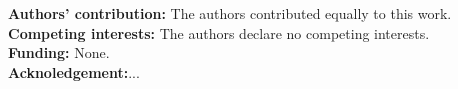 \documentclass[a4paper, 12pt]{article}
\begin{document}

\newpage
{}








\noindent\small \textbf{Authors' contribution:} The authors contributed equally to this work. \\ 
\noindent\small \textbf{Competing interests:} The authors declare no competing interests.\\
\noindent\small \textbf{Funding:} None.\\
\noindent\small \textbf{Acknoledgement:}...



\nocite{*}           %
\printbibliography 


\end{document}
